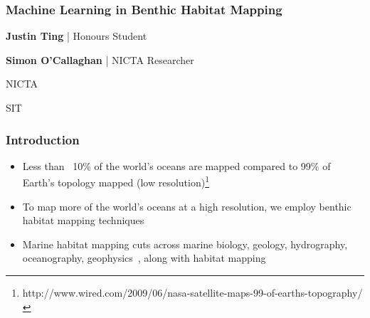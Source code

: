 \documentclass{beamer}
\begin{document}
\begin{frame}
    \frametitle{Machine Learning in Benthic Habitat Mapping}
    \textbf{Justin Ting} | Honours Student

    \textbf{Simon O'Callaghan} | NICTA Researcher

    NICTA

    SIT

\end{frame}

\begin{frame}
    \frametitle{Introduction}
    \begin{itemize}
        \item Less than ~10\% of the world's oceans are mapped compared to 99\% of Earth's topology mapped (low resolution)\footnote{http://www.wired.com/2009/06/nasa-satellite-maps-99-of-earths-topography/}
        \item To map more of the world's oceans at a high resolution, we employ benthic habitat mapping techniques
        \item Marine habitat mapping cuts across marine biology, geology, hydrography, oceanography, geophysics~\citep{cjbrown11}, along with habitat mapping
    \end{itemize}
\end{frame}
\end{document}
